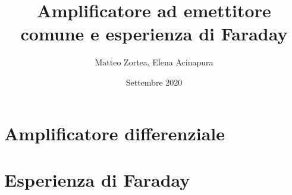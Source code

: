 \documentclass{article}
\author{Matteo Zortea, Elena Acinapura}
\date{Settembre 2020}
\title{Amplificatore ad emettitore comune e esperienza di Faraday}
\newcommand{\onlyinsubfile}[1]{#1}
\newcommand{\notinsubfile}[1]{}
\begin{document}
    \maketitle
    \renewcommand{\onlyinsubfile}[1]{}
    \renewcommand{\notinsubfile}[1]{#1}
    \section*{Amplificatore differenziale}
    
    \newpage
    \section*{Esperienza di Faraday}
    
\end{document}
